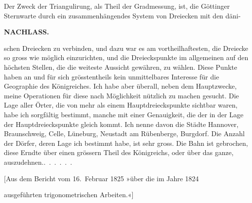 Der Zweck der Triangulirung, als Theil der Gradmessung, ist, die Göttinger
Sternwarte durch ein zusammenhängendes System von Dreiecken mit den \mbox{däni-}
\par\smallskip\noindent\hfill\makebox[0.18\linewidth][l]{52\textsuperscript{*}}\par
\clearpage
\noindent{}\hfill{\small\textbf{NACHLASS.}}\hfill\null\par\medskip
\noindent schen Dreiecken zu verbinden, und dazu war es am vortheilhaftesten, die Dreiecke
so gross wie möglich einzurichten, und die Dreieckspunkte im allgemeinen
auf den höchsten Stellen, die die weiteste Aussicht gewähren, zu wählen.
Diese Punkte haben an und für sich grösstentheils kein unmittelbares Interesse
für die Geographie des Königreiches. Ich habe aber überall, neben dem
Hauptzwecke, meine Operationen für diese nach Möglichkeit nützlich zu
machen gesucht. Die Lage aller Örter, die von mehr als einem Hauptdreieckspunkte
sichtbar waren, habe ich sorgfältig bestimmt, manche mit einer
Genauigkeit, die der in der Lage der Hauptdreieckspunkte gleich kommt. Ich
nenne davon die Städte Hannover, Braunschweig, Celle, Lüneburg, Neustadt
am Rübenberge, Burgdorf. Die Anzahl der Dörfer, deren Lage ich bestimmt
habe, ist sehr gross. Die Bahn ist gebrochen, diese Erndte über einen
grössern Theil des Königreichs, oder über das ganze, auszudehnen.\quad\mbox{.\ .\ .\ .\ .\ .}

\bigskip
\begin{center}
[Aus dem Bericht vom 16.~Februar 1825 »über die im Jahre 1824\par
ausgeführten trigonometrischen Arbeiten.«]
\end{center}

